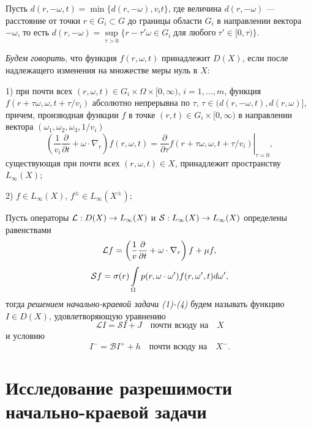 \documentclass[12pt,reqno]{report}
\begin{document}
Пусть $d(r,-\omega,t)=\min\{d(r,-\omega), v_i t  \}$, где  величина $d(r,-\omega)$ --- расстояние от точки $r \in G_i \subset G$ до
границы области $G_i$ в направлении вектора $-\omega$, то есть
$d(r,-\omega) = \sup \limits_{\tau
	> 0} \{ r- \tau' \omega \in G_i \; \text{для любого} \; \tau' \in [0,\tau) \}$.

{\it Будем говорить}, что функция $f(r,\omega,t)$ принадлежит
$D(X)$, если после надлежащего изменения на множестве меры нуль в
$X$:

1) при почти всех $(r,\omega,t) \in G_i \times \Omega
\times [0,\infty)$, $i=1,...,m$, функция $f(r+\tau\omega,\omega,t+\tau/v_i)$
абсолютно непрерывна по $\tau,\,\tau \in
(d(r,-\omega,t), d(r,\omega)]$, причем, производная   функции $f$ в точке $(r,t)\in G_i \times [0,\infty)$  в направлении вектора $(\omega_1,\omega_2,\omega_3,1/v_i)$
$$ 
\left (\frac{1}{v_i} \frac{\partial }{\partial t } + \omega
\cdot \nabla_r \right) f(r,\omega,t)= \left.
\frac{\partial}{\partial \tau}
f\left(r+\tau\omega,\omega,t+\tau/v_i\right) \right |_{\tau=0},
$$
существующая   при почти всех  $(r,\omega,t) \in X$, принадлежит  пространству $L_{\infty}
(X)$;

2) $f \in L_{\infty} (X)$, $f^{\pm}\in L_{\infty} (X^{\pm})$;



Пусть операторы ${\cal L}: D(X) \to L_{\infty}(X)$ и ${\cal S}:
L_{\infty}(X) \to L_{\infty}(X)$ определены равенствами
\begin{equation}
{\cal L} f = \left (\frac{1}{v} \frac{\partial }{\partial t } +
\omega \cdot \nabla_r \right) f + \mu f,
\end{equation}
\begin{equation}
{\cal S}f= \sigma(r)
\int\limits_{\Omega} p(r,\omega \cdot
\omega')f(r,\omega',t)d\omega',
\end{equation}
тогда {\it решением начально-краевой задачи (1)-(4)} будем
называть функцию $I \in D(X)$, удовлетворяющую уравнению
\begin{equation}
{\mathcal L} I = {\mathcal S}I + J \quad \text{почти всюду на} \quad X
\end{equation}
и условию
\begin{equation}
I^-= {\mathcal B}I^+ + h \quad \text{почти всюду на} \quad X^-.
\end{equation}



\section{Исследование разрешимости начально-краевой задачи}
\end{document}
